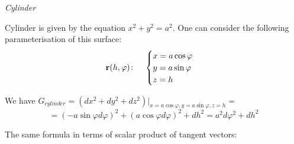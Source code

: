 \documentclass[12pt]{article}
\theoremstyle{theorem}
\numberwithin{equation}{section}
\begin{document}
\medskip

         \medskip


       \centerline  {\it Cylinder}


  Cylinder is given by the equation $x^2+y^2=a^2$. One can consider the following
parameterisation
 of this surface:
\begin{equation}\label{surface1}
  {\bf r}(h,\varphi)\colon\quad
  \begin{cases}
  x=a\cos\varphi\\
  y=a\sin\varphi\\
  z=h\\
  \end{cases}
\end{equation}

\medskip

We have   $G_{cylinder}=\left(dx^2+dy^2+dz^2\right)
       \big\vert_{x=a\cos\varphi,y=a\sin\varphi,z=h}=$
        \begin{equation}\label{firstquadraticformcylinder}
               =(-a\sin\varphi d\varphi)^2+(a\cos\varphi
              d\varphi)^2+dh^2=a^2d\varphi^2+dh^2
        \end{equation}

The same formula in terms of scalar product of tangent vectors:
\end{document}
